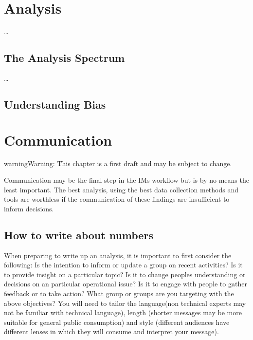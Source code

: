 \documentclass[letterpaper,10pt,english]{jupyterBook}
\begin{document}
\chapter{Analysis}
\label{\detokenize{part1/analysis:analysis}}\label{\detokenize{part1/analysis::doc}}
\sphinxAtStartPar
…


\section{The Analysis Spectrum}
\label{\detokenize{part1/analysis:the-analysis-spectrum}}
\sphinxAtStartPar
…


\section{Understanding Bias}
\label{\detokenize{part1/analysis:understanding-bias}}

\chapter{Communication}
\label{\detokenize{part1/communication:communication}}\label{\detokenize{part1/communication::doc}}
\begin{sphinxadmonition}{warning}{Warning:}
\sphinxAtStartPar
This chapter is a first draft and may be subject to change.
\end{sphinxadmonition}

\sphinxAtStartPar
Communication may be the final step in the IMs workflow but is by no means the least important. The best analysis, using the best data collection methods and tools are worthless if the communication of these findings are insufficient to inform decisions.


\section{How to write about numbers}
\label{\detokenize{part1/communication:how-to-write-about-numbers}}
\sphinxAtStartPar
When preparing to write up an analysis, it is important to first consider the following: Is the intention to inform or update a group on recent activities? Is it to provide insight on a particular topic? Is it to change peoples understanding or decisions on an particular operational issue? Is it to engage with people to gather feedback or to take action? What group or groups are you targeting with the above objectives? You will need to tailor the language(non technical experts may not be familiar with technical language), length (shorter messages may be more suitable for general public consumption) and style (different audiences have different lenses in which they will consume and interpret your message).
\end{document}
